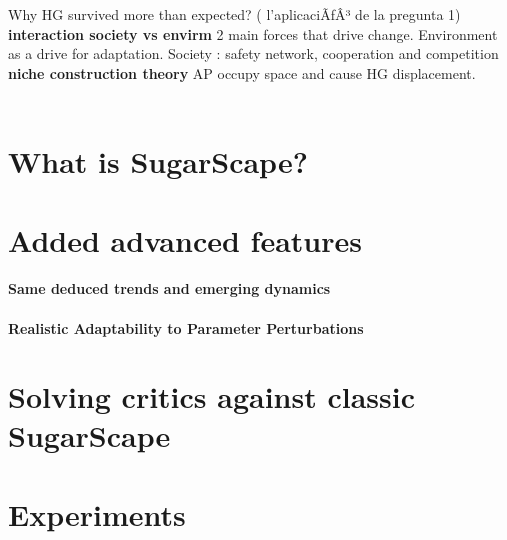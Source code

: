 \documentclass{report}
\begin{document}
		  

		



		  Why HG survived more than expected? ( l'aplicaciÃƒÂ³ de la pregunta 1)
			\textbf{interaction society vs envirm}
				2 main forces that drive change.
				Environment as a drive for adaptation.
				Society : safety network, cooperation and competition
\\
			\textbf{niche construction theory}
				AP occupy space and cause HG displacement.
\\
\\





	\section{What is SugarScape?}
	\section{Added advanced features}
		\paragraph{Same deduced trends and emerging dynamics}
		\paragraph{Realistic Adaptability to Parameter Perturbations}
	\section{Solving critics against classic SugarScape}
	\section{Experiments}
\end{document}
